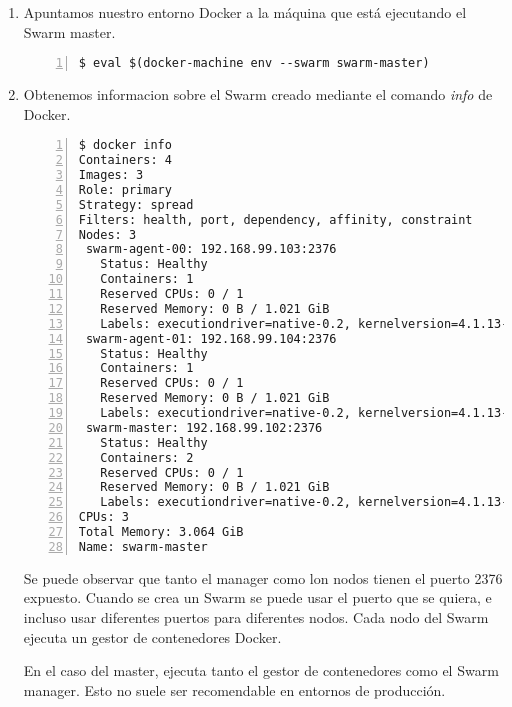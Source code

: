 			\begin{enumerate}
				\item Apuntamos nuestro entorno Docker a la máquina que está ejecutando el Swarm master.
				\begin{lstlisting}[style=consola,numbers=left]
$ eval $(docker-machine env --swarm swarm-master)
				\end{lstlisting}
				
				\item Obtenemos informacion sobre el Swarm creado mediante el comando \textit{info} de Docker.
				\begin{lstlisting}[style=consola,numbers=left]
$ docker info
Containers: 4
Images: 3
Role: primary
Strategy: spread
Filters: health, port, dependency, affinity, constraint
Nodes: 3
 swarm-agent-00: 192.168.99.103:2376
   Status: Healthy
   Containers: 1
   Reserved CPUs: 0 / 1
   Reserved Memory: 0 B / 1.021 GiB
   Labels: executiondriver=native-0.2, kernelversion=4.1.13-boot2docker, operatingsystem=Boot2Docker 1.9.1 (TCL 6.4.1); master : cef800b - Fri Nov 20 19:33:59 UTC 2015, provider=virtualbox, storagedriver=aufs
 swarm-agent-01: 192.168.99.104:2376
   Status: Healthy
   Containers: 1
   Reserved CPUs: 0 / 1
   Reserved Memory: 0 B / 1.021 GiB
   Labels: executiondriver=native-0.2, kernelversion=4.1.13-boot2docker, operatingsystem=Boot2Docker 1.9.1 (TCL 6.4.1); master : cef800b - Fri Nov 20 19:33:59 UTC 2015, provider=virtualbox, storagedriver=aufs
 swarm-master: 192.168.99.102:2376
   Status: Healthy
   Containers: 2
   Reserved CPUs: 0 / 1
   Reserved Memory: 0 B / 1.021 GiB
   Labels: executiondriver=native-0.2, kernelversion=4.1.13-boot2docker, operatingsystem=Boot2Docker 1.9.1 (TCL 6.4.1); master : cef800b - Fri Nov 20 19:33:59 UTC 2015, provider=virtualbox, storagedriver=aufs
CPUs: 3
Total Memory: 3.064 GiB
Name: swarm-master
				\end{lstlisting}
				
				Se puede observar que tanto el manager como lon nodos tienen el puerto 2376 expuesto. Cuando se crea un Swarm se puede usar el puerto que se quiera, e incluso usar diferentes puertos para diferentes nodos. Cada nodo del Swarm ejecuta un gestor de contenedores Docker.
				
				En el caso del master, ejecuta tanto el gestor de contenedores como el Swarm manager. Esto no suele ser recomendable en entornos de producción.
				

\end{enumerate}
